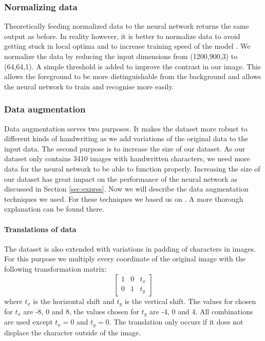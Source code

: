 \documentclass{article}
\begin{document}
\subsubsection{Normalizing data} 
\label{par:norm}
Theoretically feeding normalized data to the neural network returns the same output as before. 
In reality however, it is better to normalize data to avoid getting stuck in local optima and to increase training speed of the model \cite{NormGoal}.
We normalize the data by reducing the input dimensions from (1200,900,3) to (64,64,1). A simple threshold is added to improve the contrast in our image. 
This allows the foreground to be more distinguishable from the background and allows the neural network to train and recognise more easily. 

\subsubsection{Data augmentation}
\label{par:aug}
Data augmentation serves two purposes. It makes the dataset more robust to different kinds of handwriting as we add variations of the original data to the input data. 
The second purpose is to increase the size of our dataset. As our dataset only contains 3410 images with handwritten characters, we need more data for the neural network to be able to function properly. 
Increasing the size of our dataset has great impact on the performance of the neural network as discussed in Section \ref{sec:expres}. Now we will describe the data augmentation techniques we used. For these techniques we based us on \cite{DataAug}. A more thorough explanation can be found there. 

\paragraph{Translations of data}
The dataset is also extended with variations in padding of characters in images. For this purpose we multiply every coordinate of the original image with the following transformation matrix: 
\begin{equation}
        \begin{bmatrix}
                1 & 0 & t_x \\
                0 & 1 & t_y
        \end{bmatrix}
\end{equation}
where $t_x$ is the horizontal shift and $t_y$ is the vertical shift. The values for chosen for $t_x$ are -8, 0 and 8, the values chosen for $t_y$ are -4, 0 and 4. All combinations are used except $t_x=0$ and $t_y=0$. The translation only occurs if it does not displace the character outside of the image.
\end{document}
